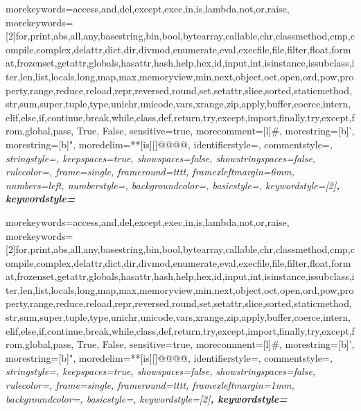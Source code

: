 \providecommand{\tightlist}{\setlength{\itemsep}{0pt}\setlength{\parskip}{0pt}}

\usepackage{subfig} %

\usepackage{cprotect}
 {
	morekeywords={access,and,del,except,exec,in,is,lambda,not,or,raise},
	morekeywords=[2]{for,print,abs,all,any,basestring,bin,bool,bytearray,callable,chr,classmethod,cmp,compile,complex,delattr,dict,dir,divmod,enumerate,eval,execfile,file,filter,float,format,frozenset,getattr,globals,hasattr,hash,help,hex,id,input,int,isinstance,issubclass,iter,len,list,locals,long,map,max,memoryview,min,next,object,oct,open,ord,pow,property,range,reduce,reload,repr,reversed,round,set,setattr,slice,sorted,staticmethod,str,sum,super,tuple,type,unichr,unicode,vars,xrange,zip,apply,buffer,coerce,intern,elif,else,if,continue,break,while,class,def,return,try,except,import,finally,try,except,from,global,pass, True, False},
	sensitive=true,
	morecomment=[l]\#,%
	morestring=[b]',%
	morestring=[b]",%
	moredelim=**[is][\color{black}]{@@}{@@},
	identifierstyle=\color{black}\footnotesize\ttfamily,
    commentstyle=\color{ipython-cyan}\footnotesize\itshape\ttfamily,
	stringstyle=\color{ipython-red}\footnotesize\ttfamily,
	keepspaces=true,
	showspaces=false,
    showstringspaces=false,
	rulecolor=\color{ipython-frame},
	frame=single,
	frameround={t}{t}{t}{t},
	framexleftmargin=6mm,
	numbers=left,
	numberstyle=\color{ipython-cyan},
	backgroundcolor=\color{ipython-bg},
	basicstyle=\footnotesize\ttfamily,
	keywordstyle=[2]\color{ipython-green}\bfseries\footnotesize\ttfamily, 
	keywordstyle=\color{ipython-purple}\bfseries\footnotesize\ttfamily
}

 {
	morekeywords={access,and,del,except,exec,in,is,lambda,not,or,raise},
	morekeywords=[2]{for,print,abs,all,any,basestring,bin,bool,bytearray,callable,chr,classmethod,cmp,compile,complex,delattr,dict,dir,divmod,enumerate,eval,execfile,file,filter,float,format,frozenset,getattr,globals,hasattr,hash,help,hex,id,input,int,isinstance,issubclass,iter,len,list,locals,long,map,max,memoryview,min,next,object,oct,open,ord,pow,property,range,reduce,reload,repr,reversed,round,set,setattr,slice,sorted,staticmethod,str,sum,super,tuple,type,unichr,unicode,vars,xrange,zip,apply,buffer,coerce,intern,elif,else,if,continue,break,while,class,def,return,try,except,import,finally,try,except,from,global,pass, True, False},
	sensitive=true,
	morecomment=[l]\#,%
	morestring=[b]',%
	morestring=[b]",%
	moredelim=**[is][\color{black}]{@@}{@@},
	identifierstyle=\color{black}\footnotesize\ttfamily,
	commentstyle=\color{ipython-cyan}\footnotesize\itshape\ttfamily,
	stringstyle=\color{ipython-red}\footnotesize\ttfamily,
	keepspaces=true,
	showspaces=false,
	showstringspaces=false,
	rulecolor=\color{ipython-frame},
	frame=single,
	frameround={t}{t}{t}{t},
	framexleftmargin=1mm,
	backgroundcolor=\color{ipython-bg},
	basicstyle=\footnotesize\ttfamily,
	keywordstyle=[2]\color{ipython-green}\bfseries\footnotesize\ttfamily, 
	keywordstyle=\color{ipython-purple}\bfseries\footnotesize\ttfamily
}

